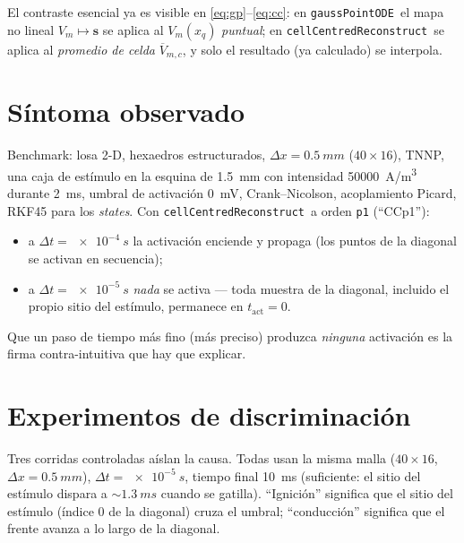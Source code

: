 \documentclass[11pt,a4paper]{article}
\newcommand{\Vm}{V_{m}}
\newcommand{\code}[1]{\texttt{\small #1}}
\newcommand{\gpode}{\code{gaussPointODE}}
\newcommand{\ccrec}{\code{cellCentredReconstruct}}
\newcommand{\states}{\mathbf{s}}
\newcommand{\Vbarc}{\overline{V}_{m,c}}
\begin{document}
El contraste esencial ya es visible en \eqref{eq:gp}--\eqref{eq:cc}: en \gpode\ el
mapa no lineal $\Vm\!\mapsto\!\states$ se aplica al $\Vm(x_q)$ \emph{puntual}; en
\ccrec\ se aplica al \emph{promedio de celda} $\Vbarc$, y solo el resultado (ya
calculado) se interpola.

\section{Síntoma observado}

Benchmark: losa 2-D, hexaedros estructurados, $\Delta x=\SI{0.5}{mm}$
($40\times16$), TNNP, una caja de estímulo en la esquina de \SI{1.5}{mm} con
intensidad \SI{50000}{A/m^3} durante \SI{2}{ms}, umbral de activación \SI{0}{mV},
Crank--Nicolson, acoplamiento Picard, RKF45 para los \emph{states}. Con \ccrec\ a
orden \code{p1} (``CCp1''):
\begin{itemize}[nosep]
  \item a $\Delta t=\SI{e-4}{s}$ la activación enciende y propaga
        (los puntos de la diagonal se activan en secuencia);
  \item a $\Delta t=\SI{e-5}{s}$ \emph{nada} se activa --- toda muestra de la
        diagonal, incluido el propio sitio del estímulo, permanece en
        $t_{\mathrm{act}}=0$.
\end{itemize}
Que un paso de tiempo más fino (más preciso) produzca \emph{ninguna} activación es
la firma contra-intuitiva que hay que explicar.

\section{Experimentos de discriminación}

Tres corridas controladas aíslan la causa. Todas usan la misma malla
($40\times16$, $\Delta x=\SI{0.5}{mm}$), $\Delta t=\SI{e-5}{s}$, tiempo final
\SI{10}{ms} (suficiente: el sitio del estímulo dispara a ${\sim}\SI{1.3}{ms}$
cuando se gatilla). ``Ignición'' significa que el sitio del estímulo (índice $0$
de la diagonal) cruza el umbral; ``conducción'' significa que el frente avanza a
lo largo de la diagonal.
\end{document}
